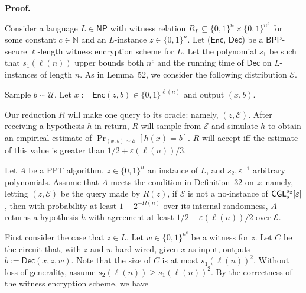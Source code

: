 


\par\medskip\noindent\textbf{Proof.}\par




Consider a language $L\in{\mathsf{NP}}$ with witness relation $R_{L}\subseteq\{0,1\}^{n}\times\{0,1\}^{n^{c}}$ for some constant $c\in\mathbb{N}$ and an $L$-instance $z\in\{0,1\}^{n}$. Let (${\mathsf{Enc}}$, ${\mathsf{Dec}}$) be a ${\mathsf{BPP}}$-secure $\ell$-length witness encryption scheme for $L$. Let the polynomial $s_{1}$ be such that $s_{1}(\ell(n))$ upper bounds both $n^{c}$ and the running time of ${\mathsf{Dec}}$ on $L$-instances of length $n$. As in Lemma 52, we consider the following distribution $\mathcal{E}$.\par



Sample $b\sim\mathcal{U}$. Let $x:={\mathsf{Enc}}(z,b)\in\{0,1\}^{\ell(n)}$ and output $(x,b)$.\par



Our reduction $R$ will make one query to its oracle: namely, $(z,\mathcal{E})$. After receiving a hypothesis $h$ in return, $R$ will sample from $\mathcal{E}$ and simulate $h$ to obtain an empirical estimate of $\Pr_{(x,b)\sim\mathcal{E}}[h(x)=b]$. $R$ will accept iff the estimate of this value is greater than $1/2+\varepsilon(\ell(n))/3$.\par




Let $A$ be a PPT algorithm, $z\in\{0,1\}^{n}$ an instance of $L$, and $s_{2},\varepsilon^{-1}$ arbitrary polynomials. Assume that $A$ meets the condition in Definition 32 on $z$: namely, letting $(z,\mathcal{E})$ be the query made by $R(z)$, if $\mathcal{E}$ is not a no-instance of ${\sf CGL}_{s_{1}}^{s_{2}}[\varepsilon]$, then with probability at least $1-2^{-\Omega(n)}$ over its internal randomness, $A$ returns a hypothesis $h$ with agreement at least $1/2+\varepsilon(\ell(n))/2$ over $\mathcal{E}$.\par




First consider the case that $z\in L$. Let $w\in\{0,1\}^{n^{c}}$ be a witness for $z$. Let $C$ be the circuit that, with $z$ and $w$ hard-wired, given $x$ as input, outputs $b:={\mathsf{Dec}}(x,z,w)$. Note that the size of $C$ is at most $s_{1}(\ell(n))^{2}$. Without loss of generality, assume $s_{2}(\ell(n))\geq s_{1}(\ell(n))^{2}$. By the correctness of the witness encryption scheme, we have\par


